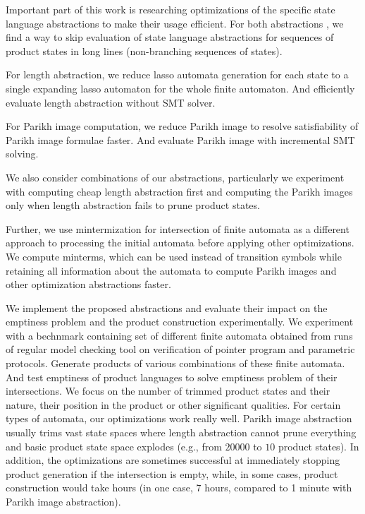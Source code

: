 
Important part of this work is researching optimizations of the specific state language abstractions to make their usage efficient. For both abstractions , we find a way to skip evaluation of state language abstractions for sequences of product states in long lines (non-branching sequences of states).

For length abstraction, we reduce lasso automata generation for each state to a single expanding lasso automaton for the whole finite automaton. And efficiently evaluate length abstraction without SMT solver.

For Parikh image computation, we reduce Parikh image to resolve satisfiability of Parikh image formulae faster. And evaluate Parikh image with incremental SMT solving.

We also consider combinations of our abstractions, particularly we experiment with computing cheap length abstraction first and computing the Parikh images only when length abstraction fails to prune product states.


Further, we use mintermization for intersection of finite automata as a different approach to processing the initial automata before applying other optimizations. We compute minterms, which can be used instead of transition symbols while retaining all information about the automata to compute Parikh images and other optimization abstractions faster.


We implement the proposed abstractions and evaluate their impact on the emptiness problem and the product construction experimentally. We experiment with a bechnmark containing set of different finite automata obtained from runs of regular model checking tool on verification of pointer program and parametric protocols. Generate products of various combinations of these finite automata. And test emptiness of product languages to solve emptiness problem of their intersections. We focus on the number of trimmed product states and their nature, their position in the product or other significant qualities. For certain types of automata, our optimizations work really well. Parikh image abstraction usually trims vast state spaces where length abstraction cannot prune everything and basic product state space explodes (e.g., from $20000$ to $10$ product states). In addition, the optimizations are sometimes successful at immediately stopping product generation if the intersection is empty, while, in some cases, product construction would take hours (in one case, 7 hours, compared to 1 minute with Parikh image abstraction).

